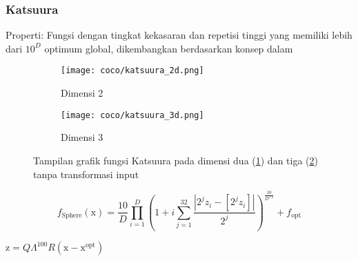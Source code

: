 \subsubsection{Katsuura}
\noindent Properti:
Fungsi dengan tingkat kekasaran dan repetisi tinggi yang memiliki lebih dari $10^D$ optimum global, dikembangkan berdasarkan konsep dalam \citep{Katsuura:1991:CND}
\begin{figure}[H]
	\centering
	\begin{subfigure}[b]{0.4\textwidth}
		\centering
		\texttt{[image: coco/katsuura\_2d.png]}
		\caption{Dimensi 2}
		\label{fig:katsuura_coco_2d}
	\end{subfigure}
	\hfill
	\begin{subfigure}[b]{0.4\textwidth}
		\centering
		\texttt{[image: coco/katsuura\_3d.png]}
		\caption{Dimensi 3}
		\label{fig:katsuura_coco_3d}
	\end{subfigure}
	\caption{Tampilan grafik fungsi Katsuura pada dimensi dua (\cref{fig:katsuura_coco_2d}) dan tiga (\cref{fig:katsuura_coco_3d}) tanpa transformasi input}
	\label{fig:katsuura_coco}
\end{figure}
\begin{equation}
  f_{\text{Sphere}}(\mathrm{x})=\frac{10}{D}\prod_{i=1}^{D}(1+i\sum_{j=1}^{32}\frac{|2^jz_i-[2^jz_i]|}{2^j})^{\frac{10}{D^{1.2}}}+f_{\text{opt}}
\end{equation}
\begin{packed_item}
    \item $\mathrm{z}=Q\Lambda^{100}R(\mathrm{x}-\mathrm{x}^{\text{opt}})$
\end{packed_item}

